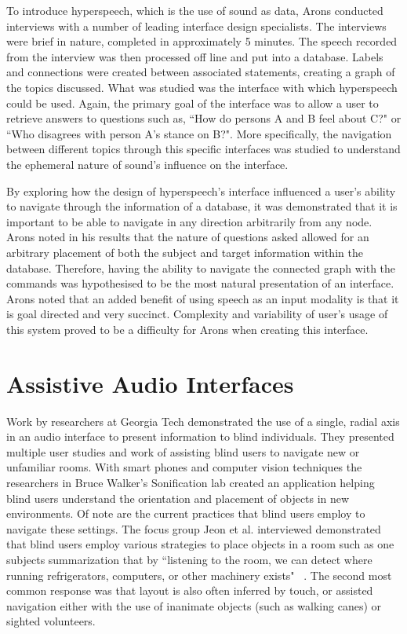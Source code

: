 To introduce hyperspeech, which is the use of sound as data, Arons conducted 
interviews with a number of leading interface design specialists.  The interviews
were brief in nature, completed in approximately 5 minutes.  The speech recorded
from the interview was then processed off line and put into a database. Labels 
and connections were created between associated statements, creating a graph of
the topics discussed.  What was studied was the interface with which 
hyperspeech could be used.  Again, the primary goal of the interface was to 
allow a user to retrieve answers to questions such as, ``How do persons A and B
feel about C?" or ``Who disagrees with person A's stance on B?".  More 
specifically, the navigation between different topics through this specific
interfaces was studied to understand the ephemeral nature of sound's influence
on the interface.

By exploring how the design of hyperspeech's interface influenced a user's 
ability to navigate through the information of a database, it was demonstrated
that it is important to be able to navigate in any direction arbitrarily from 
any node. Arons noted in his results that the nature of questions asked allowed
for an arbitrary placement of both the subject and target information within the 
database. Therefore, having the ability to navigate the connected graph with
the commands was hypothesised to be the most natural presentation of an interface. 
Arons noted that an added benefit of using speech as an input modality is that it
is goal directed and very succinct. Complexity and variability of user's usage of 
this system proved to be a difficulty for Arons when creating this interface.

\section{                 Assistive Audio Interfaces                           }

Work by researchers at Georgia Tech demonstrated the use of a single, radial axis
in an audio interface to present information to blind individuals. They presented
multiple user studies and work of assisting blind users to navigate new or unfamiliar
rooms.  With smart phones and computer vision techniques the researchers in
Bruce Walker's Sonification lab created an application helping blind users understand
the orientation and placement of objects in new environments. Of note are the
current practices that blind users employ to navigate these settings. The focus group
Jeon et al. interviewed demonstrated that blind users employ
various strategies to place objects in a room such as one subjects summarization
that by ``listening to the room, we can detect where running refrigerators,
computers, or other machinery exists" ~\cite{jeon2012listen2droom}. The second
most common response was that layout is also often inferred by touch, or assisted
navigation either with the use of inanimate objects (such as walking canes)
or sighted volunteers.

